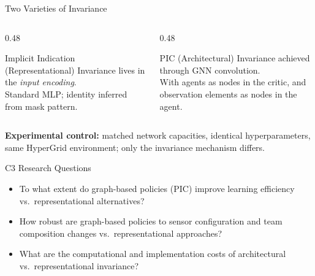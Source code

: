 \begin{frame}{Two Varieties of Invariance}

    \vspace{0.3em}
    \begin{columns}
        \begin{column}{0.48\textwidth}
            \begin{block}{Implicit Indication (Representational)}
                Invariance lives in the \emph{input encoding}.\\
                Standard MLP; identity inferred from mask pattern.
            \end{block}
        \end{column}
        \begin{column}{0.48\textwidth}
            \begin{block}{PIC (Architectural)}
                Invariance achieved through GNN convolution. \\
                With agents as nodes in the critic, 
                and observation elements as nodes in the agent.
            \end{block}
        \end{column}
    \end{columns}
    \vspace{1em}

    \small \textbf{Experimental control:} matched network capacities,
    identical hyperparameters, same HyperGrid environment;
    only the invariance mechanism differs.

\end{frame}


\begin{frame}{C3 Research Questions}
    \begin{itemize}
        \item[\textbf{RQ3.1}]
        To what extent do graph-based policies (PIC) improve learning
        efficiency vs.\ representational alternatives?
        \item[\textbf{RQ3.2}]
        How robust are graph-based policies to sensor configuration
        and team composition changes vs.\ representational approaches?
        \item[\textbf{RQ3.3}]
        What are the computational and implementation costs of
        architectural vs.\ representational invariance?
    \end{itemize}
    
\end{frame}


